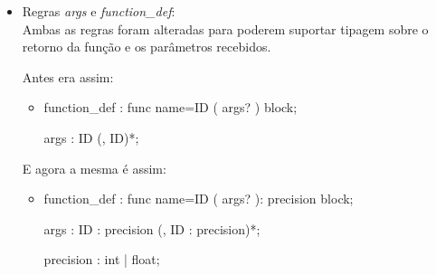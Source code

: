 \begin{itemize}
		\item Regras \textit{args} e \textit{function\_def}:\\
			Ambas as regras foram alteradas para poderem suportar tipagem sobre o retorno da função e os parâmetros recebidos.
			
			Antes era assim:			
			\begin{itemize}
				\item
				
				function\_def : \textquotesingle func\textquotesingle \vspace{0.1cm} name=ID \textquotesingle(\textquotesingle \vspace{0.1cm} args? \textquotesingle)\textquotesingle \vspace{0.1cm} block;

				args : ID (\textquotesingle ,\textquotesingle \vspace{0.1cm} ID)*;
			\end{itemize}
			
			E agora a mesma é assim:
			\begin{itemize}
				\item 
				
				function\_def : \textquotesingle func\textquotesingle \vspace{0.1cm} name=ID \textquotesingle(\textquotesingle \vspace{0.1cm} args? \textquotesingle)\textquotesingle \textquotesingle :\textquotesingle \vspace{0.1cm} precision \vspace{0.1cm} block;

				args : ID \textquotesingle :\textquotesingle \vspace{0.1cm} precision (\textquotesingle ,\textquotesingle \vspace{0.1cm} ID \textquotesingle :\textquotesingle \vspace{0.1cm} precision)*;

				precision : \textquotesingle int\textquotesingle \vspace{0.1cm} | \textquotesingle float\textquotesingle ;
			\end{itemize}
	\end{itemize}
	
